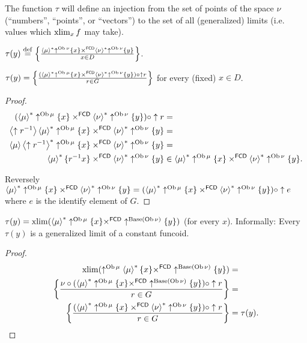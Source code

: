 The function $\tau$ will define an injection from the set of points
of the space $\nu$ (``numbers'', ``points'', or ``vectors'')
to the set of all (generalized) limits (i.e. values which $\xlim_{x}f$
may take).
\begin{defn}
$\tau(y)\eqdef\setcond{\rsupfun{\mu}\uparrow^{\Ob\nu}\{x\}\times^{\mathsf{FCD}}\rsupfun{\nu}\uparrow^{\Ob\nu}\{y\}}{x\in D}$.\end{defn}
\begin{prop}
$\tau(y)=\setcond{(\rsupfun{\mu}\uparrow^{\Ob\mu}\{x\}\times^{\mathsf{FCD}}\rsupfun{\nu}\uparrow^{\Ob\nu}\{y\})\circ\uparrow r}{r\in G}$
for every (fixed) $x\in D$.\end{prop}
\begin{proof}
~
\begin{align*}
(\rsupfun{\mu}\uparrow^{\Ob\mu}\{x\}\times^{\mathsf{FCD}}\rsupfun{\nu}\uparrow^{\Ob\nu}\{y\})\circ\uparrow r & =\\
\supfun{\uparrow r^{-1}}\rsupfun{\mu}\uparrow^{\Ob\mu}\{x\}\times^{\mathsf{FCD}}\rsupfun{\nu}\uparrow^{\Ob\nu}\{y\} & =\\
\supfun{\mu}\rsupfun{\uparrow r^{-1}}\uparrow^{\Ob\mu}\{x\}\times^{\mathsf{FCD}}\rsupfun{\nu}\uparrow^{\Ob\nu}\{y\} & =\\
\rsupfun{\mu}\{r^{-1}x\}\times^{\mathsf{FCD}}\rsupfun{\nu}\uparrow^{\Ob\nu}\{y\} & \in\rsupfun{\mu}\uparrow^{\Ob\mu}\{x\}\times^{\mathsf{FCD}}\rsupfun{\nu}\uparrow^{\Ob\nu}\{y\}.
\end{align*}


Reversely $\rsupfun{\mu}\uparrow^{\Ob\mu}\{x\}\times^{\mathsf{FCD}}\rsupfun{\nu}\uparrow^{\Ob\nu}\{y\}=(\rsupfun{\mu}\uparrow^{\Ob\mu}\{x\}\times^{\mathsf{FCD}}\rsupfun{\nu}\uparrow^{\Ob\nu}\{y\})\circ\uparrow e$
where $e$ is the identify element of $G$.\end{proof}
\begin{prop}
$\tau(y)=\xlim(\rsupfun{\mu}\uparrow^{\Ob\mu}\{x\}\times^{\mathsf{FCD}}\uparrow^{\Base(\Ob\nu)}\{y\})$
(for every $x$). Informally: Every $\tau(y)$ is a generalized limit
of a constant funcoid.\end{prop}
\begin{proof}
~
\begin{align*}
\xlim(\uparrow^{\Ob\mu}\rsupfun{\mu}\{x\}\times^{\mathsf{FCD}}\uparrow^{\Base(\Ob\nu)}\{y\}) & =\\
\setcond{\nu\circ(\rsupfun{\mu}\uparrow^{\Ob\mu}\{x\}\times^{\mathsf{FCD}}\uparrow^{\Base(\Ob\nu)}\{y\})\circ\uparrow r}{r\in G} & =\\
\setcond{(\rsupfun{\mu}\uparrow^{\Ob\mu}\{x\}\times^{\mathsf{FCD}}\rsupfun{\nu}\uparrow^{\Ob\nu}\{y\})\circ\uparrow r}{r\in G} & =\tau(y).
\end{align*}
\end{proof}
